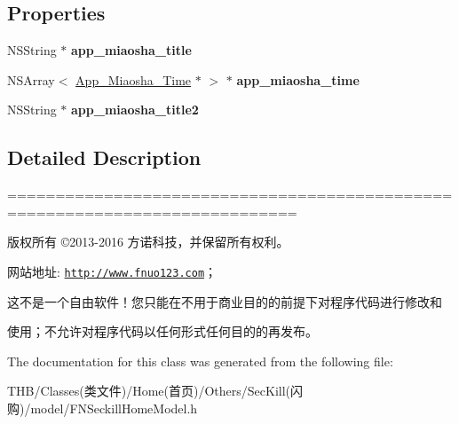 \subsection*{Properties}
\begin{DoxyCompactItemize}
\item 
\mbox{\label{interface_f_n_seckill_home_model_a07ca30144374f756ee99daab17af7799}} 
N\+S\+String $\ast$ {\bfseries app\+\_\+miaosha\+\_\+title}
\item 
\mbox{\label{interface_f_n_seckill_home_model_a0dc25250714d9afe5d9775e12c2fc2e3}} 
N\+S\+Array$<$ \mbox{\hyperlink{interface_app___miaosha___time}{App\+\_\+\+Miaosha\+\_\+\+Time}} $\ast$ $>$ $\ast$ {\bfseries app\+\_\+miaosha\+\_\+time}
\item 
\mbox{\label{interface_f_n_seckill_home_model_a3fed95955a015e32e90f083831116972}} 
N\+S\+String $\ast$ {\bfseries app\+\_\+miaosha\+\_\+title2}
\end{DoxyCompactItemize}


\subsection{Detailed Description}
============================================================================

版权所有 ©2013-\/2016 方诺科技，并保留所有权利。

网站地址\+: \href{http://www.fnuo123.com}{\tt http\+://www.\+fnuo123.\+com}； 



这不是一个自由软件！您只能在不用于商业目的的前提下对程序代码进行修改和

使用；不允许对程序代码以任何形式任何目的的再发布。 

 

The documentation for this class was generated from the following file\+:\begin{DoxyCompactItemize}
\item 
T\+H\+B/\+Classes(类文件)/\+Home(首页)/\+Others/\+Sec\+Kill(闪购)/model/F\+N\+Seckill\+Home\+Model.\+h\end{DoxyCompactItemize}
